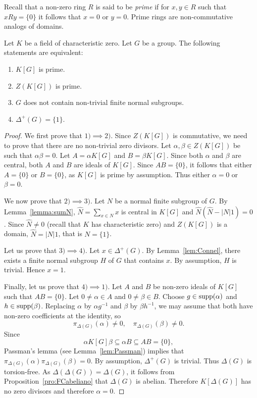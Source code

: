 \begin{graybox}
Recall that a non-zero ring $R$ is said to be \emph{prime} 
if for $x,y\in R$ such that $xRy=\{0\}$ it follows that $x=0$ or $y=0$. Prime rings
are non-commutative analogs of domains. 

\begin{theorem}[Connell]
	\label{thm:Connel}
	Let $K$ be a field of characteristic zero. Let 
	$G$ be a group. The following statements are equivalent: 
	\begin{enumerate}
		\item $K[G]$ is prime.
		\item $Z(K[G])$ is prime.
		\item $G$ does not contain non-trivial finite normal subgroups. 
		\item $\Delta^+(G)=\{1\}$.
	\end{enumerate}
\end{theorem}

\begin{proof}
	We first prove that $1)\implies2)$. Since $Z(K[G])$ is commutative, we need to prove that 
	there are no non-trivial zero divisors. Let $\alpha,\beta\in Z(K[G])$ be such that 
	$\alpha\beta=0$. Let $A=\alpha K[G]$ and $B=\beta K[G]$. Since both $\alpha$ and 
	$\beta$ are central, both $A$ and $B$ are ideals of $K[G]$. Since $AB=\{0\}$,
	it follows that either $A=\{0\}$ or $B=\{0\}$, as $K[G]$ is prime by assumption. 
	Thus either $\alpha=0$ or 
	$\beta=0$.

	We now prove that $2)\implies3)$. Let $N$ be a normal finite subgroup of $G$. 
	By Lemma~\ref{lemma:sumN}, $\widehat{N}=\sum_{x\in N}x$ is central in 
	$K[G]$ and $\widehat{N}(\widehat{N}-|N|1)=0$. Since $\widehat{N}\ne 0$ (recall that 
	$K$ has characteristic zero) and $Z(K[G])$ is a domain,
	$\widehat{N}=|N|1$, that is $N=\{1\}$.

	Let us prove that $3)\implies4)$. Let $x\in\Delta^+(G)$. By Lemma~\ref{lem:Connel},
	there exists a finite normal subgroup $H$ of $G$ that contains $x$. By assumption, $H$ is trivial. 
	Hence $x=1$.

	Finally, let us prove that $4)\implies1)$. Let $A$ and $B$ be non-zero ideals of 
	$K[G]$ such that $AB=\{0\}$. Let $0\ne\alpha\in A$ and 
	$0\ne \beta\in
	B$. Choose 
	$g\in\operatorname{supp}(\alpha)$ and $h\in\operatorname{supp}(\beta)$. Replacing $\alpha$ by $\alpha g^{-1}$ and 
	$\beta$ by $\beta h^{-1}$, we may assume that 
	both have non-zero coefficients at the identity, so 
	\[
	\pi_{\Delta(G)}(\alpha)\ne 0,\quad \pi_{\Delta(G)}(\beta)\ne 0.
	\]
	Since 
	\[
	\alpha K[G]\beta\subseteq \alpha B\subseteq AB=\{0\},
	\]
	Passman's lemma (see Lemma~\ref{lem:Passman}) 
	implies that $\pi_{\Delta(G)}(\alpha)\pi_{\Delta(G)}(\beta)=0$.
	By assumption, $\Delta^+(G)$ is trivial. 
	Thus $\Delta(G)$ is torsion-free. 
	As $\Delta(\Delta(G))=\Delta(G)$, it follows from 
	Proposition~\ref{pro:FCabeliano} that  
	$\Delta(G)$ is abelian. Therefore 
	$K[\Delta(G)]$ has no zero divisors and therefore $\alpha=0$. 
\end{proof}


\end{graybox}
